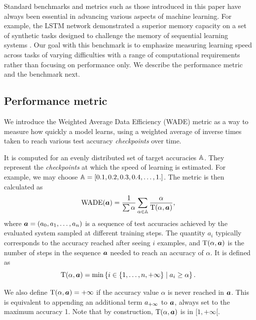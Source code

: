 Standard benchmarks and metrics such as those introduced in this paper have
always been essential in advancing various aspects of machine learning. For
example, the LSTM network demonstrated a superior memory capacity on a set of
synthetic tasks designed to challenge the memory of sequential learning systems
\parencite{hochreiterLongShortTermMemory1997}. Our goal with this benchmark is to
emphasize measuring learning speed across tasks of varying difficulties with a
range of computational requirements rather than focusing on performance only. We describe the performance metric and the benchmark next.



\subsection{Performance metric\label{sec:performance-metric}}

We introduce the Weighted Average Data Efficiency (WADE) metric as a way to
measure how quickly a model learns, using a weighted average of inverse times
taken to reach various test accuracy \emph{checkpoints} over time.

It is computed for an evenly distributed set of target accuracies ${\mathbb{A}}$. They
represent the \emph{checkpoints} at which the speed of learning is estimated.
For example, we may choose ${\mathbb{A}} = [0.1, 0.2, 0.3, 0.4, \ldots, 1.]$. The metric is
then calculated as
\begin{equation}
\text{WADE}({\bm{a}}) = \frac{1}{\sum \alpha} \sum_{\alpha \in \mathbb{A}}\frac{\alpha}{\text{T}(\alpha, {\bm{a}})},
\label{eq:wade}
\end{equation}
where ${\bm{a}} = ({a}_{0}, {a}_{1}, \ldots, {a}_{n})$ is a sequence of test accuracies achieved by the evaluated system
sampled at different training steps. The quantity $a_{i}$ typically
corresponds to the accuracy reached after seeing $i$ examples, and
$\text{T}(\alpha, {\bm{a}})$ is the number of steps in the sequence ${\bm{a}}$ needed to reach
an accuracy of $\alpha$. It is defined as
\begin{equation}
  \text{T}(\alpha, {\bm{a}}) = \min\left\{ i \in \{1, \ldots, n, + \infty \}\; |\; a_{i} \geq \alpha \right\}.
\label{eq:tto}
\end{equation}

We also define $\text{T}(\alpha, {\bm{a}}) = +\infty$ if the accuracy value $\alpha$ is never
reached in ${\bm{a}}$. This is equivalent to appending an additional term ${a}_{+\infty}$
to ${\bm{a}}$, always set to the maximum accuracy 1. Note that by construction,
$\text{T}(\alpha, {\bm{a}})$ is in $[1, + \infty [$.

